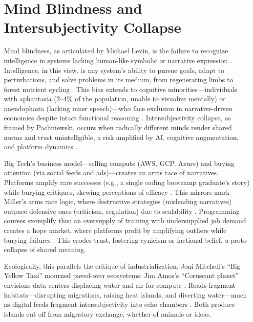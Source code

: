 \documentclass{article}
\begin{document}
\section{Mind Blindness and Intersubjectivity Collapse}
\label{sec:mind_blindness}

Mind blindness, as articulated by Michael Levin, is the failure to recognize intelligence in systems lacking human-like symbolic or narrative expression \citep{levin2022technological}. Intelligence, in this view, is any system's ability to pursue goals, adapt to perturbations, and solve problems in its medium, from regenerating limbs to forest nutrient cycling \citep{levin2019computational}. This bias extends to cognitive minorities—individuals with aphantasia (2–4\% of the population, unable to visualize mentally) or anendophasia (lacking inner speech)—who face exclusion in narrative-driven economies despite intact functional reasoning \citep{jacobs2022, bps_anendophasia}. Intersubjectivity collapse, as framed by Pachniewski, occurs when radically different minds render shared norms and trust unintelligible, a risk amplified by AI, cognitive augmentation, and platform dynamics \citep{pachniewski2023intersubjectivity}.

Big Tech’s business model—selling compute (AWS, GCP, Azure) and buying attention (via social feeds and ads)—creates an arms race of narratives. Platforms amplify rare successes (e.g., a single coding bootcamp graduate’s story) while burying critiques, skewing perceptions of efficacy \citep{zuboff2019age, wu2016attention}. This mirrors mark Miller’s arms race logic, where destructive strategies (misleading narratives) outpace defensive ones (criticism, regulation) due to scalability \citep{miller1988markets}. Programming courses exemplify this: an oversupply of training with undersupplied job demand creates a hope market, where platforms profit by amplifying outliers while burying failures \citep{carr2010shallows}. This erodes trust, fostering cynicism or factional belief, a proto-collapse of shared meaning.

Ecologically, this parallels the critique of industrialization. Joni Mitchell’s “Big Yellow Taxi” mourned paved-over ecosystems; Jim Amos’s “Coruscant planet” envisions data centers displacing water and air for compute \citep{lanham2006economics}. Roads fragment habitats—disrupting migrations, raising heat islands, and diverting water—much as digital feeds fragment intersubjectivity into echo chambers \citep{arendt1958human}. Both produce islands cut off from migratory exchange, whether of animals or ideas.
\end{document}
